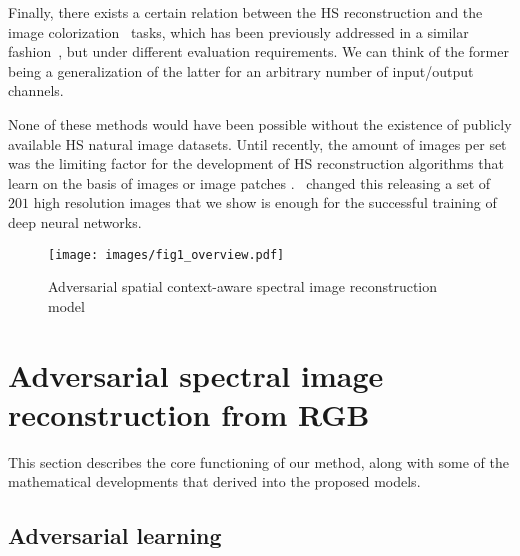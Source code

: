 \documentclass[10pt,twocolumn,letterpaper]{article}
\begin{document}
Finally, there exists a certain relation between the HS reconstruction and the image colorization~\cite{Cheng_2015_ICCV} tasks, which has been previously addressed in a similar fashion~\cite{zhang_colorful_2016,Isola_2017_CVPR}, but under different evaluation requirements.
We can think of the former being a generalization of the latter for an arbitrary number of input/output channels. 

None of these methods would have been possible without the existence of publicly available HS natural image datasets. Until recently, the amount of images per set was the limiting factor for the development of HS reconstruction algorithms that learn on the basis of images or image patches
\cite{foster_frequency_2006,yasuma_generalized_2010,chakrabarti2011statistics,nguyen_training-based_2014,eckhard_outdoor_2015,foster_time-lapse_2016}.~\cite{arad_sparse_2016} changed this releasing a set of $201$ high resolution images that we show is enough for the successful training of deep neural networks.   

\begin{figure*}
	\begin{center}
		\texttt{[image: images/fig1\_overview.pdf]}
	\end{center}
	\caption{Adversarial spatial context-aware spectral image reconstruction model}
	\label{fig:overview}
\end{figure*}

\section{Adversarial spectral image reconstruction from RGB}
\label{sec:adv_rgb2hs}

This section describes the core functioning of our method, along with some of the mathematical developments that derived into the proposed models.
\subsection{Adversarial learning}
\end{document}
